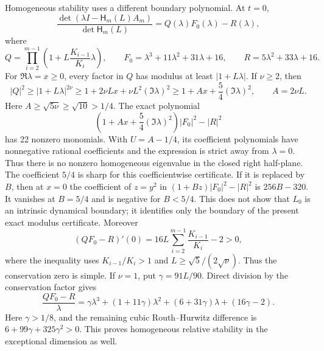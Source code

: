 \documentclass[10pt]{article}
\newcommand{\1}{\mathbf1}
\begin{document}
Homogeneous stability uses a different boundary polynomial.  At $t=0$,
\[
 \frac{\det(\lambda I-\mathsf H_m(L) A_m)}{\det \mathsf H_m(L)}
 =Q(\lambda)F_0(\lambda)-R(\lambda),
\]
where
\[
 Q=\prod_{i=2}^{m-1}\left(1+L\frac{K_{i-1}}{K_i}\lambda\right),\qquad
 F_0=\lambda^3+11\lambda^2+31\lambda+16,
 \qquad R=5\lambda^2+33\lambda+16.
\]
For $\Re\lambda=x\ge0$, every factor in $Q$ has modulus at least
$|1+L\lambda|$.  If $\nu\ge2$, then
\[
 |Q|^2\ge |1+L\lambda|^{2\nu}
 \ge 1+2\nu Lx+\nu L^2(\Im\lambda)^2
 \ge 1+Ax+\frac54(\Im\lambda)^2,
 \qquad A=2\nu L.
\]
Here $A\ge\sqrt{5\nu}\ge\sqrt{10}>1/4$.
The exact polynomial
\[
 \left(1+Ax+\frac54(\Im\lambda)^2\right)|F_0|^2-|R|^2
\]
has 22 nonzero monomials.  With $U=A-1/4$, its coefficient polynomials have
nonnegative rational coefficients and the expression is strict away from
$\lambda=0$.  Thus there is no nonzero homogeneous eigenvalue in the closed
right half-plane.  The coefficient $5/4$ is sharp for this coefficientwise
certificate.  If it
is replaced by $B$, then at $x=0$ the coefficient of $z=y^2$ in
$(1+Bz)|F_0|^2-|R|^2$ is $256B-320$.  It vanishes at $B=5/4$ and is negative
for $B<5/4$.  This does not show that $L_0$ is an intrinsic dynamical
boundary; it identifies only the boundary of the present exact modulus
certificate.  Moreover
\[
 (QF_0-R)'(0)=16L\sum_{i=2}^{m-1}\frac{K_{i-1}}{K_i}-2>0,
\]
where the inequality uses $K_{i-1}/K_i>1$ and
$L\ge\sqrt5/(2\sqrt\nu)$.  Thus the conservation zero is simple.  If
$\nu=1$, put $\gamma=91L/90$.  Direct
division by the conservation factor gives
\[
 \frac{QF_0-R}{\lambda}
 =\gamma\lambda^3+(1+11\gamma)\lambda^2
 +(6+31\gamma)\lambda+(16\gamma-2).
\]
Here $\gamma>1/8$, and the remaining cubic Routh--Hurwitz difference is
$6+99\gamma+325\gamma^2>0$.  This proves homogeneous relative stability in the
exceptional dimension as well.
\end{document}
